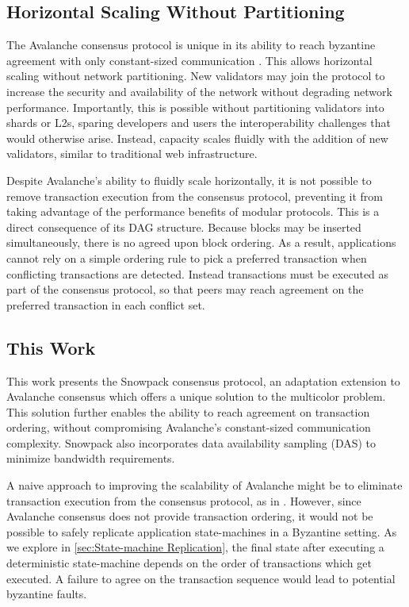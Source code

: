 \documentclass[12pt]{article}
\begin{document}
\subsection{Horizontal Scaling Without Partitioning}
  The Avalanche consensus protocol is unique in its ability to reach byzantine
  agreement with only constant-sized communication \cite{rocket}. This allows
  horizontal scaling without network partitioning. New validators may join the
  protocol to increase the security and availability of the network without
  degrading network performance. Importantly, this is possible without
  partitioning validators into shards or L2s, sparing developers and users the
  interoperability challenges that would otherwise arise. Instead, capacity
  scales fluidly with the addition of new validators, similar to traditional
  web infrastructure.

  Despite Avalanche's ability to fluidly scale horizontally, it is not possible
  to remove transaction execution from the consensus protocol, preventing it
  from taking advantage of the performance benefits of modular protocols. This
  is a direct consequence of its DAG structure. Because blocks may be inserted
  simultaneously, there is no agreed upon block ordering. As a result,
  applications cannot rely on a simple ordering rule to pick a preferred
  transaction when conflicting transactions are detected. Instead transactions
  must be executed as part of the consensus protocol, so that peers may reach
  agreement on the preferred transaction in each conflict set.

\subsection{This Work}
  This work presents the Snowpack consensus protocol, an adaptation extension
  to Avalanche consensus which offers a unique solution to the multicolor
  problem. This solution further enables the ability to reach agreement on
  transaction ordering, without compromising Avalanche's constant-sized
  communication complexity. Snowpack also incorporates data availability
  sampling (DAS) \cite{albassam2019fraud} to minimize bandwidth requirements.

  A naive approach to improving the scalability of Avalanche might be to
  eliminate transaction execution from the consensus protocol, as in
  \cite{LazyLedger}. However, since Avalanche consensus does not provide
  transaction ordering, it would not be possible to safely replicate
  application state-machines in a Byzantine setting. As we explore in
  \ref{sec:State-machine Replication}, the final state after executing a
  deterministic state-machine depends on the order of transactions which get
  executed. A failure to agree on the transaction sequence would lead to
  potential byzantine faults.
\end{document}
